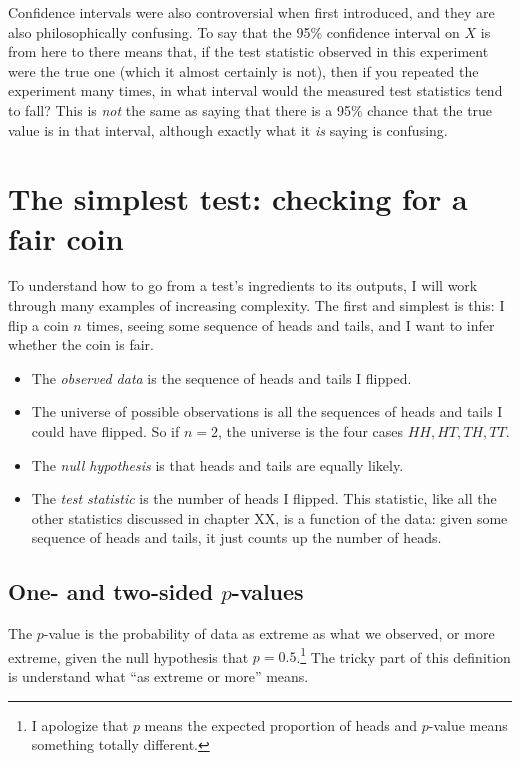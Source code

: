 Confidence intervals were also controversial when first introduced, and they are also philosophically confusing. To say that the 95\% confidence interval on $X$ is from here to there means that, if the test statistic observed in this experiment were the true one (which it almost certainly is not), then if you repeated the experiment many times, in what interval would the measured test statistics tend to fall? This is \emph{not} the same as saying that there is a 95\% chance that the true value is in that interval, although exactly what it \emph{is} saying is confusing.

\section{The simplest test: checking for a fair coin}

To understand how to go from a test's ingredients to its outputs, I will work
through many examples of increasing complexity. The first and simplest is this: I flip a coin $n$ times, seeing some sequence of heads and tails, and I want to infer whether the coin is fair.

\begin{itemize}
\item The \emph{observed data} is the sequence of heads and tails I flipped.
\item The universe of possible observations is all the sequences of heads and tails I could have flipped. So if $n=2$, the universe is the four cases $HH, HT, TH, TT$.
\item The \emph{null hypothesis} is that heads and tails are equally likely.
\item The \emph{test statistic} is the number of heads I flipped. This statistic, like all the other statistics discussed in chapter XX, is a function of the data: given some sequence of heads and tails, it just counts up the number of heads.
\end{itemize}

\subsection{One- and two-sided $p$-values}

The $p$-value is the probability of data as extreme as what we observed, or
more extreme, given the null hypothesis that $p = 0.5$.\footnote{I apologize
that $p$ means the expected proportion of heads and $p$-value means something
totally different.} The tricky part of this definition is understand what ``as
extreme or more'' means.

